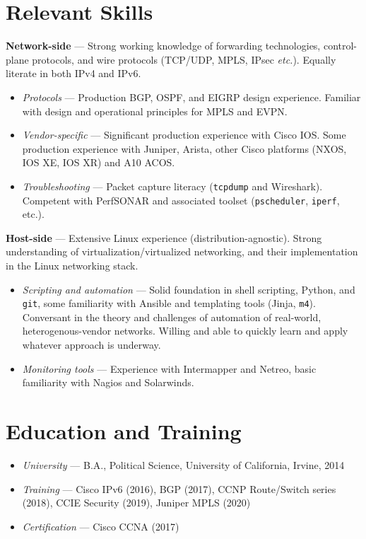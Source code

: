 \documentclass[10pt]{article}
\begin{document}
\section*{Relevant Skills}
\textbf{Network-side} --- Strong working knowledge of forwarding technologies, control-plane protocols, and wire protocols (TCP/UDP, MPLS, IPsec \emph{etc.}). Equally literate in both IPv4 and IPv6.
\begin{itemize}
	\item{}\emph{Protocols} --- Production BGP, OSPF, and EIGRP design experience. Familiar with design and operational principles for MPLS and EVPN.
	\item{}\emph{Vendor-specific} --- Significant production experience with Cisco IOS. Some production experience with Juniper, Arista, other Cisco platforms (NXOS, IOS XE, IOS XR) and A10 ACOS.
	\item{}\emph{Troubleshooting} --- Packet capture literacy (\texttt{tcpdump} and Wireshark). Competent with PerfSONAR and associated toolset (\texttt{pscheduler}, \texttt{iperf}, etc.).
\end{itemize}
\textbf{Host-side} --- Extensive Linux experience (distribution-agnostic). Strong understanding of virtualization/virtualized networking, and their implementation in the Linux networking stack.
\begin{itemize}
	\item{}\emph{Scripting and automation} --- Solid foundation in shell scripting, Python, and \texttt{git}, some familiarity with Ansible and templating tools (Jinja, \texttt{m4}). Conversant in the theory and challenges of automation of real-world, heterogenous-vendor networks. Willing and able to quickly learn and apply whatever approach is underway.
	\item{}\emph{Monitoring tools} --- Experience with Intermapper and Netreo, basic familiarity with Nagios and Solarwinds.
\end{itemize}

\section*{Education and Training}

\begin{itemize}
	\item{}\emph{University} --- B.A., Political Science, University of California, Irvine, 2014
	\item{}\emph{Training} --- Cisco IPv6 (2016), BGP (2017), CCNP Route/Switch series (2018), CCIE Security (2019), Juniper MPLS (2020)
	\item{}\emph{Certification} --- Cisco CCNA (2017)
\end{itemize}
\end{document}

